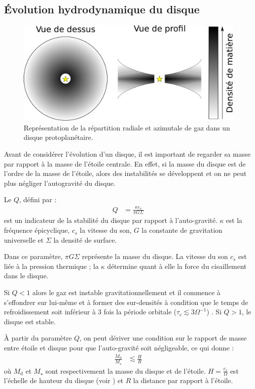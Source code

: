\subsection{Évolution hydrodynamique du disque}
\begin{figure}[htbp]
\centering
\includegraphics[width=0.6\linewidth]{figure/disk_scheme.pdf}
\caption[Vue de face et de profil d'un disque de gaz.]{Représentation de la répartition radiale et azimutale
de gaz dans un disque protoplanétaire.}\label{fig:disk_scheme}
\end{figure}

Avant de considérer l'évolution d'un disque, il est important de regarder sa masse par rapport à la masse de l'étoile centrale. En effet, si la masse du disque est de l'ordre de la masse de l'étoile, alors des instabilités se développent et on ne peut plus négliger l'autogravité du disque. 

Le  $Q$, défini par \citep{toomre1964gravitational, goldreich1965gravitational}:
\begin{align}
Q &= \frac{\kappa c_{s}}{\pi G \Sigma}
\end{align}
est un indicateur de la stabilité du disque par rapport à l'auto-gravité. $\kappa$ est la fréquence épicyclique, $c_s$ la vitesse du son, $G$ la constante de gravitation universelle et $\Sigma$ la densité de surface. 

Dans ce paramètre, $\pi G \Sigma$ représente la masse du disque. La vitesse du son $c_{s}$ est liée à la pression thermique ; la  $\kappa$ détermine quant à elle la force du cisaillement dans le disque.

\bigskip

Si $Q<1$ alors le gaz est instable gravitationnellement et il commence à s'effondrer sur lui-même et à former des sur-densités à
condition que le temps de refroidissement soit inférieur à 3 fois la période orbitale ($\tau_c \lesssim 3 \Omega^{-1}$)
\citep{gammie2001nonlinear}.
Si $Q>1$, le disque est stable.

À partir du paramètre $Q$, on peut dériver une condition sur le rapport de masse entre étoile et disque pour que l'auto-gravité soit négligeable, ce qui donne \citep{gammie2001nonlinear} : 
\begin{align}
\frac{M_\text{d}}{M_\star} &\lesssim \frac{H}{R}
\end{align}
où $M_\text{d}$ et $M_\star$ sont respectivement la masse du disque et de l'étoile. $H=\frac{c_s}{\Omega}$ est l'échelle de hauteur du disque (voir ) et $R$ la distance par rapport à l'étoile.

